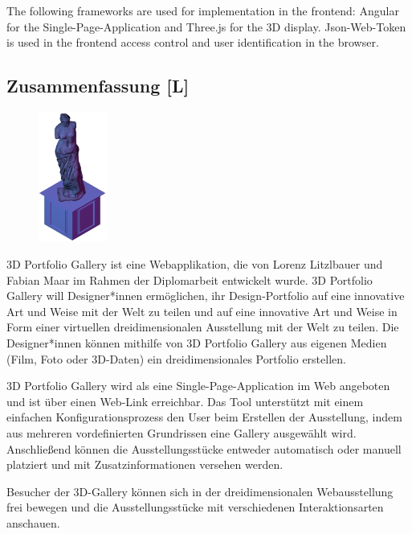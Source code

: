 The following frameworks are used for implementation in the frontend: Angular for the Single-Page-Application and Three.js for the 3D display. Json-Web-Token is used in the frontend access control and user identification in the browser.
\newpage
\begin{spacing}{1}
    \chapter*{Zusammenfassung [L]}
\end{spacing}
\begin{figure}
    \begin{center}
      \includegraphics[width=0.2\textwidth]{pics/statue.png}
    \end{center}
\end{figure}
3D Portfolio Gallery ist eine Webapplikation, die von Lorenz Litzlbauer und Fabian Maar im Rahmen der Diplomarbeit entwickelt wurde. 3D Portfolio Gallery will Designer*innen ermöglichen, ihr Design-Portfolio auf eine innovative Art und Weise mit der Welt zu teilen und auf eine innovative Art und Weise in Form einer virtuellen dreidimensionalen Ausstellung mit der Welt zu teilen. Die Designer*innen können mithilfe von 3D Portfolio Gallery aus eigenen Medien (Film, Foto oder 3D-Daten) ein dreidimensionales Portfolio erstellen.

3D Portfolio Gallery wird als eine Single-Page-Application im Web angeboten und ist über einen Web-Link erreichbar. Das Tool unterstützt mit einem einfachen Konfigurationsprozess den User beim Erstellen der Ausstellung, indem aus mehreren vordefinierten Grundrissen eine Gallery ausgewählt wird. Anschließend können die Ausstellungsstücke entweder automatisch oder manuell platziert und mit Zusatzinformationen versehen werden.

Besucher der 3D-Gallery können sich in der dreidimensionalen Webausstellung frei bewegen und die Ausstellungsstücke mit verschiedenen Interaktionsarten anschauen.

